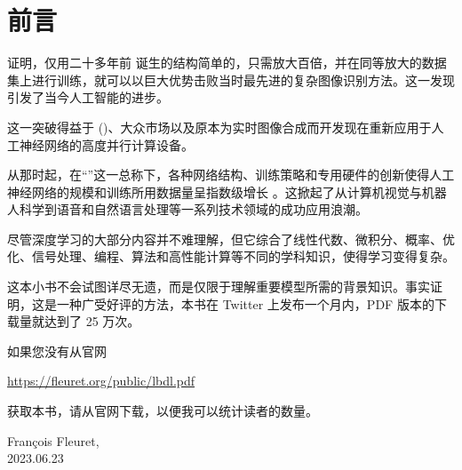
\chapter*{前言}

\cite{nips-1502.c399862d3b9d6b76c8436e924a68c45b} 证明，仅用二十多年前 \citep{lecun-89e} 诞生的结构简单的，只需放大百倍，并在同等放大的数据集上进行训练，就可以以巨大优势击败当时最先进的复杂图像识别方法。这一发现引发了当今人工智能的进步。

这一突破得益于 ()、大众市场以及原本为实时图像合成而开发现在重新应用于人工神经网络的高度并行计算设备。

从那时起，在``''这一总称下，各种网络结构、训练策略和专用硬件的创新使得人工神经网络的规模和训练所用数据量呈指数级增长 \cite{arxiv-2202.05924}。这掀起了从计算机视觉与机器人科学到语音和自然语言处理等一系列技术领域的成功应用浪潮。

尽管深度学习的大部分内容并不难理解，但它综合了线性代数、微积分、概率、优化、信号处理、编程、算法和高性能计算等不同的学科知识，使得学习变得复杂。

这本小书不会试图详尽无遗，而是仅限于理解重要模型所需的背景知识。事实证明，这是一种广受好评的方法，本书在 Twitter 上发布一个月内，PDF 版本的下载量就达到了 25 万次。

如果您没有从官网 
\begin{center}
\href{https://fleuret.org/public/lbdl.pdf}{https://fleuret.org/public/lbdl.pdf}
\end{center}
获取本书，请从官网下载，以便我可以统计读者的数量。

\begin{flushright}
  François Fleuret,\\
  2023.06.23
\end{flushright}